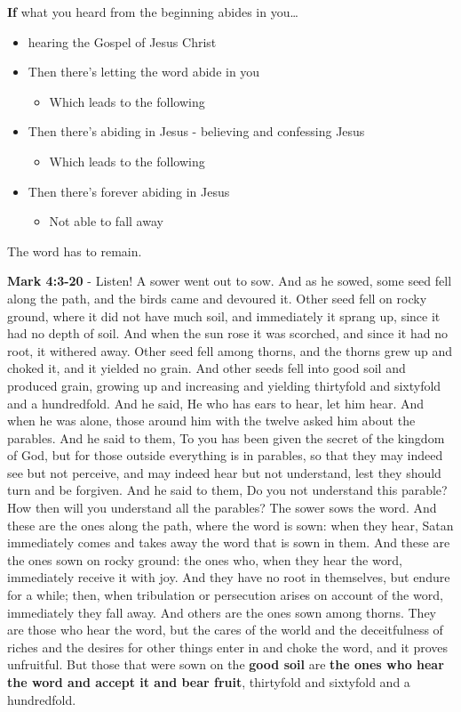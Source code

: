 \documentclass[11pt]{article}
\begin{document}
\textbf{If} what you heard from the beginning abides in you\ldots{}

\begin{itemize}
\item hearing the Gospel of Jesus Christ
\item Then there's letting the word abide in you
\begin{itemize}
\item Which leads to the following
\end{itemize}
\item Then there's abiding in Jesus - believing and confessing Jesus
\begin{itemize}
\item Which leads to the following
\end{itemize}
\item Then there's forever abiding in Jesus
\begin{itemize}
\item Not able to fall away
\end{itemize}
\end{itemize}

The word has to remain.

\textbf{Mark 4:3-20} - Listen! A sower went out to sow.  And as he sowed, some seed fell along the path, and the birds came and devoured it.  Other seed fell on rocky ground, where it did not have much soil, and immediately it sprang up, since it had no depth of soil.  And when the sun rose it was scorched, and since it had no root, it withered away.  Other seed fell among thorns, and the thorns grew up and choked it, and it yielded no grain.  And other seeds fell into good soil and produced grain, growing up and increasing and yielding thirtyfold and sixtyfold and a hundredfold.  And he said, He who has ears to hear, let him hear.  And when he was alone, those around him with the twelve asked him about the parables.  And he said to them, To you has been given the secret of the kingdom of God, but for those outside everything is in parables, so that they may indeed see but not perceive, and may indeed hear but not understand, lest they should turn and be forgiven.  And he said to them, Do you not understand this parable? How then will you understand all the parables?  The sower sows the word.  And these are the ones along the path, where the word is sown: when they hear, Satan immediately comes and takes away the word that is sown in them.  And these are the ones sown on rocky ground: the ones who, when they hear the word, immediately receive it with joy.  And they have no root in themselves, but endure for a while; then, when tribulation or persecution arises on account of the word, immediately they fall away.  And others are the ones sown among thorns. They are those who hear the word, but the cares of the world and the deceitfulness of riches and the desires for other things enter in and choke the word, and it proves unfruitful.  But those that were sown on the \textbf{good soil} are \textbf{the ones who hear the word and accept it and bear fruit}, thirtyfold and sixtyfold and a hundredfold.
\end{document}

